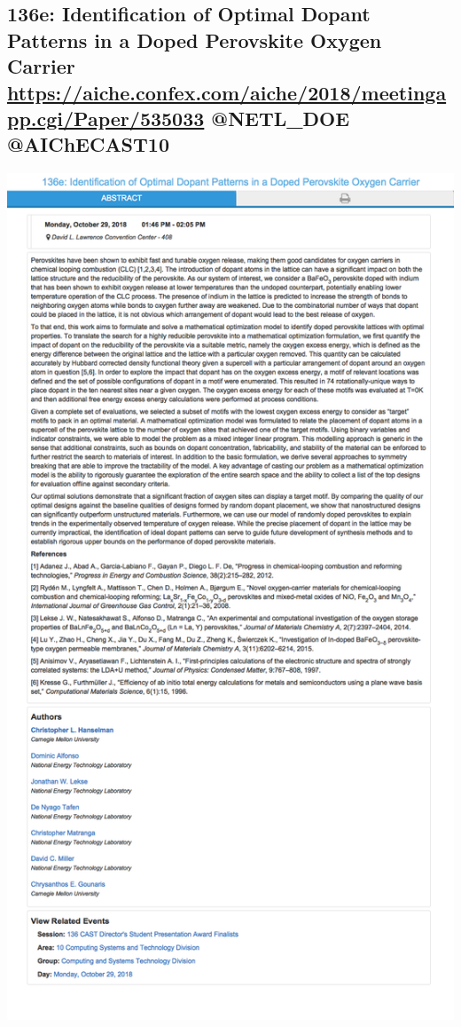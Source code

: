 \documentclass[11pt]{article}
\begin{document}
\subsection{136e: Identification of Optimal Dopant Patterns in a Doped Perovskite Oxygen Carrier \url{https://aiche.confex.com/aiche/2018/meetingapp.cgi/Paper/535033} @NETL\_DOE @AIChECAST10}
\label{sec:orgf871346}
\begin{center}
\includegraphics[width=.9\linewidth]{./535033.png}
\end{center}
\end{document}
